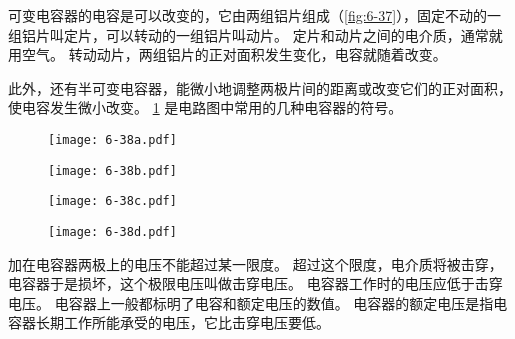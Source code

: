 可变电容器的电容是可以改变的，它由两组铝片组成（\cref{fig:6-37}），固定不动的一组铝片叫定片，可以转动的一组铝片叫动片。
定片和动片之间的电介质，通常就用空气。
转动动片，两组铝片的正对面积发生变化，电容就随着改变。

此外，还有半可变电容器，能微小地调整两极片间的距离或改变它们的正对面积，使电容发生微小改变。
\cref{fig:6-38} 是电路图中常用的几种电容器的符号。
\begin{figure}
	\begin{minipage}{0.24\linewidth}\centering
	  \texttt{[image: 6-38a.pdf]}
		\label{fig:6-38a}
	\end{minipage}
	\begin{minipage}{0.24\linewidth}\centering
	  \texttt{[image: 6-38b.pdf]}
		\label{fig:6-38b}
	\end{minipage}
	\begin{minipage}{0.24\linewidth}\centering
	  \texttt{[image: 6-38c.pdf]}
		\label{fig:6-38c}
	\end{minipage}
	\begin{minipage}{0.24\linewidth}\centering
	  \texttt{[image: 6-38d.pdf]}
		\label{fig:6-38d}
	\end{minipage}
	\caption{}\label{fig:6-38}
\end{figure}

加在电容器两极上的电压不能超过某一限度。
超过这个限度，电介质将被击穿，电容器于是损坏，这个极限电压叫做击穿电压。
电容器工作时的电压应低于击穿电压。
电容器上一般都标明了电容和额定电压的数值。
电容器的额定电压是指电容器长期工作所能承受的电压，它比击穿电压要低。


